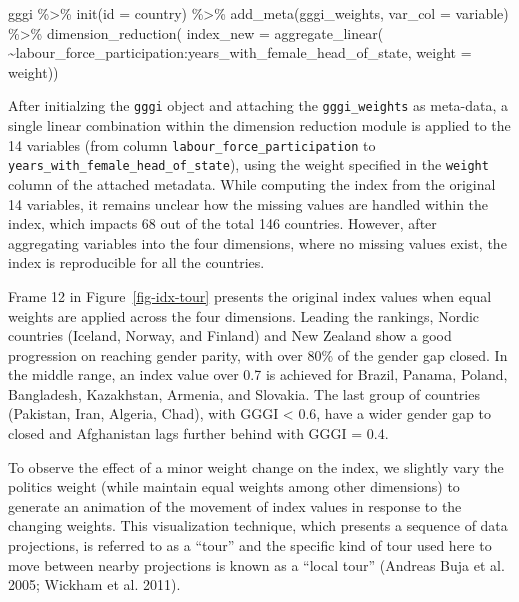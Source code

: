\documentclass[
]{interact}
\newenvironment{Shaded}{\begin{snugshade}}{\end{snugshade}}
\newcommand{\AttributeTok}[1]{\textcolor[rgb]{0.40,0.45,0.13}{#1}}
\newcommand{\FunctionTok}[1]{\textcolor[rgb]{0.28,0.35,0.67}{#1}}
\newcommand{\NormalTok}[1]{\textcolor[rgb]{0.00,0.23,0.31}{#1}}
\newcommand{\SpecialCharTok}[1]{\textcolor[rgb]{0.37,0.37,0.37}{#1}}
\begin{document}
\begin{Shaded}
\begin{Highlighting}[]
\NormalTok{gggi }\SpecialCharTok{\%\textgreater{}\%} 
  \FunctionTok{init}\NormalTok{(}\AttributeTok{id =}\NormalTok{ country) }\SpecialCharTok{\%\textgreater{}\%}
  \FunctionTok{add\_meta}\NormalTok{(gggi\_weights, }\AttributeTok{var\_col =}\NormalTok{ variable) }\SpecialCharTok{\%\textgreater{}\%} 
  \FunctionTok{dimension\_reduction}\NormalTok{(}
    \AttributeTok{index\_new =} \FunctionTok{aggregate\_linear}\NormalTok{(}
      \SpecialCharTok{\textasciitilde{}}\NormalTok{labour\_force\_participation}\SpecialCharTok{:}\NormalTok{years\_with\_female\_head\_of\_state,}
      \AttributeTok{weight =}\NormalTok{ weight)) }
\end{Highlighting}
\end{Shaded}

After initialzing the \texttt{gggi} object and attaching the
\texttt{gggi\_weights} as meta-data, a single linear combination within
the dimension reduction module is applied to the 14 variables (from
column \texttt{labour\_force\_participation} to
\texttt{years\_with\_female\_head\_of\_state}), using the weight
specified in the \texttt{weight} column of the attached metadata. While
computing the index from the original 14 variables, it remains unclear
how the missing values are handled within the index, which impacts 68
out of the total 146 countries. However, after aggregating variables
into the four dimensions, where no missing values exist, the index is
reproducible for all the countries.

Frame 12 in Figure~\ref{fig-idx-tour} presents the original index values
when equal weights are applied across the four dimensions. Leading the
rankings, Nordic countries (Iceland, Norway, and Finland) and New
Zealand show a good progression on reaching gender parity, with over
80\% of the gender gap closed. In the middle range, an index value over
0.7 is achieved for Brazil, Panama, Poland, Bangladesh, Kazakhstan,
Armenia, and Slovakia. The last group of countries (Pakistan, Iran,
Algeria, Chad), with GGGI \textless{} 0.6, have a wider gender gap to
closed and Afghanistan lags further behind with GGGI = 0.4.

To observe the effect of a minor weight change on the index, we slightly
vary the politics weight (while maintain equal weights among other
dimensions) to generate an animation of the movement of index values in
response to the changing weights. This visualization technique, which
presents a sequence of data projections, is referred to as a ``tour''
and the specific kind of tour used here to move between nearby
projections is known as a ``local tour'' (Andreas Buja et al. 2005;
Wickham et al. 2011).
\end{document}
